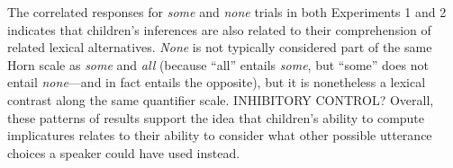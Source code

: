 \documentclass[10pt,letterpaper]{article}
\begin{document}
The correlated responses for \emph{some} and \emph{none} trials in both Experiments 1 and 2 indicates that children's inferences are also related to their comprehension of related lexical alternatives. \emph{None} is not typically considered part of the same Horn scale as \emph{some} and \emph{all} (because ``all'' entails \emph{some}, but ``some'' does not entail \emph{none}---and in fact entails the opposite), but it is nonetheless a lexical contrast along the same quantifier scale. INHIBITORY CONTROL? Overall, these patterns of results support the idea that children's ability to compute implicatures relates to their ability to consider what other possible utterance choices a speaker could have used instead.  








\end{document}
